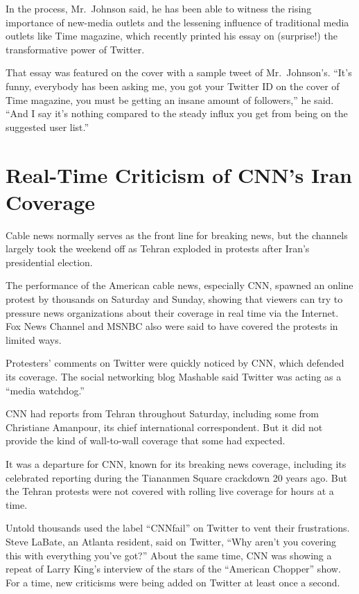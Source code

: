﻿\documentclass[12pt,a4paper,onecolumn]{article}
\begin{document}
In the process, Mr.~Johnson said, he has been able to witness the rising importance of new-media
outlets and the lessening influence of traditional media outlets like Time magazine, which recently
printed his essay on (surprise!) the transformative power of Twitter.

That essay was featured on the cover with a sample tweet of Mr.~Johnson's. ``It's funny, everybody
has been asking me, you got your Twitter ID on the cover of Time magazine, you must be getting an
insane amount of followers,'' he said. ``And I say it's nothing compared to the steady influx you
get from being on the suggested user list.''

\section{Real-Time Criticism of CNN's Iran Coverage}

Cable news normally serves as the front line for breaking news, but the channels largely took the
weekend off as Tehran exploded in protests after Iran's presidential election.

The performance of the American cable news, especially CNN, spawned an online protest by thousands
on Saturday and Sunday, showing that viewers can try to pressure news organizations about their
coverage in real time via the Internet. Fox News Channel and MSNBC also were said to have covered
the protests in limited ways.

Protesters' comments on Twitter were quickly noticed by CNN, which defended its coverage. The social
networking blog Mashable said Twitter was acting as a ``media watchdog.''

CNN had reports from Tehran throughout Saturday, including some from Christiane Amanpour, its chief
international correspondent. But it did not provide the kind of wall-to-wall coverage that some had
expected.

It was a departure for CNN, known for its breaking news coverage, including its celebrated reporting
during the Tiananmen Square crackdown 20 years ago. But the Tehran protests were not covered with
rolling live coverage for hours at a time.

Untold thousands used the label ``CNNfail'' on Twitter to vent their frustrations. Steve LaBate, an
Atlanta resident, said on Twitter, ``Why aren't you covering this with everything you've got?''
About the same time, CNN was showing a repeat of Larry King's interview of the stars of the
``American Chopper'' show. For a time, new criticisms were being added on Twitter at least once a
second.
\end{document}
